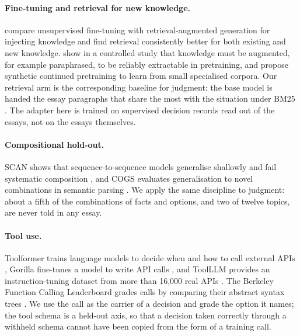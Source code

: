 \paragraph{Fine-tuning and retrieval for new knowledge.}
\citet{ovadia2023finetuning} compare unsupervised fine-tuning with retrieval-augmented
generation \citep{lewis2020rag} for injecting knowledge and find retrieval consistently
better for both existing and new knowledge. \citet{allenzhu2023physics31} show in a
controlled study that knowledge must be augmented, for example paraphrased, to be reliably
extractable in pretraining, and \citet{yang2024syntheticcpt} propose synthetic continued
pretraining to learn from small specialised corpora. Our retrieval arm is the corresponding
baseline for judgment: the base model is handed the essay paragraphs that share the most with
the situation under BM25 \citep{robertson2009bm25}. The adapter here is trained on supervised
decision records read out of the essays, not on the essays themselves.

\paragraph{Compositional hold-out.}
SCAN shows that sequence-to-sequence models generalise shallowly and fail systematic
composition \citep{lake2018scan}, and COGS evaluates generalisation to novel combinations in
semantic parsing \citep{kim2020cogs}. We apply the same discipline to judgment: about a fifth of
the combinations of facts and options, and two of twelve topics, are never told in any essay.

\paragraph{Tool use.}
Toolformer trains language models to decide when and how to call external APIs
\citep{schick2023toolformer}, Gorilla fine-tunes a model to write API calls
\citep{patil2023gorilla}, and ToolLLM provides an instruction-tuning dataset from more than
16,000 real APIs \citep{qin2023toolllm}. The Berkeley Function Calling Leaderboard grades
calls by comparing their abstract syntax trees \citep{patil2025bfcl}. We use the call as the carrier
of a decision and grade the option it names; the tool schema is a held-out axis, so that a
decision taken correctly through a withheld schema cannot have been copied from the form of a
training call.

